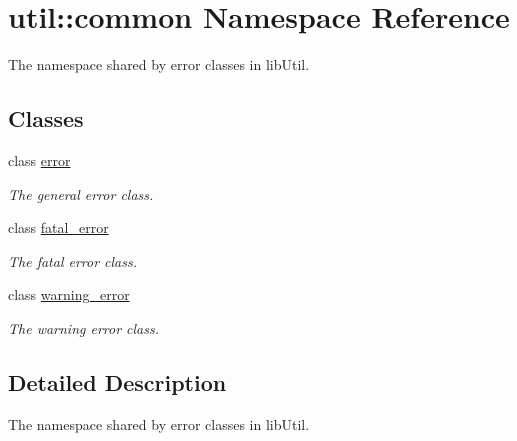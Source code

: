 \hypertarget{namespaceutil_1_1common}{\section{util\-:\-:common \-Namespace \-Reference}
\label{namespaceutil_1_1common}
}


\-The namespace shared by error classes in lib\-Util.  


\subsection*{\-Classes}
\begin{DoxyCompactItemize}
\item 
class \hyperlink{classutil_1_1common_1_1error}{error}
\begin{DoxyCompactList}\small\item\em \-The general error class. \end{DoxyCompactList}\item 
class \hyperlink{classutil_1_1common_1_1fatal__error}{fatal\-\_\-error}
\begin{DoxyCompactList}\small\item\em \-The fatal error class. \end{DoxyCompactList}\item 
class \hyperlink{classutil_1_1common_1_1warning__error}{warning\-\_\-error}
\begin{DoxyCompactList}\small\item\em \-The warning error class. \end{DoxyCompactList}\end{DoxyCompactItemize}


\subsection{\-Detailed \-Description}
\-The namespace shared by error classes in lib\-Util. 